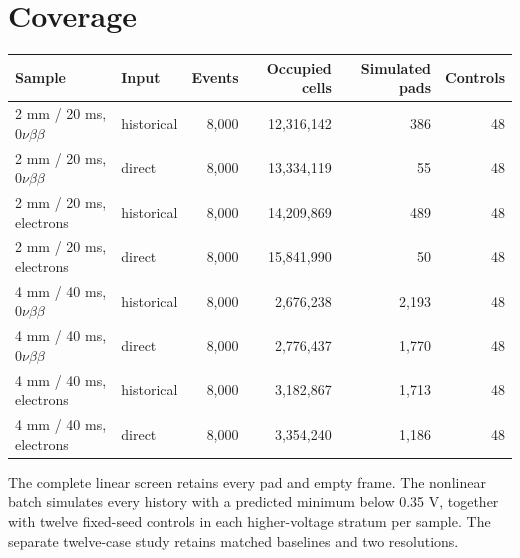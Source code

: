 \documentclass[11pt,a4paper]{article}
\begin{document}
\section{Coverage}
\begin{center}\scriptsize\begin{tabular}{llrrrr}\toprule
Sample & Input & Events & Occupied cells & Simulated pads & Controls\\\midrule
2 mm / 20 ms, $0\nu\beta\beta$ & historical & 8,000 & 12,316,142 & 386 & 48 \\
2 mm / 20 ms, $0\nu\beta\beta$ & direct & 8,000 & 13,334,119 & 55 & 48 \\
2 mm / 20 ms, electrons & historical & 8,000 & 14,209,869 & 489 & 48 \\
2 mm / 20 ms, electrons & direct & 8,000 & 15,841,990 & 50 & 48 \\
4 mm / 40 ms, $0\nu\beta\beta$ & historical & 8,000 & 2,676,238 & 2,193 & 48 \\
4 mm / 40 ms, $0\nu\beta\beta$ & direct & 8,000 & 2,776,437 & 1,770 & 48 \\
4 mm / 40 ms, electrons & historical & 8,000 & 3,182,867 & 1,713 & 48 \\
4 mm / 40 ms, electrons & direct & 8,000 & 3,354,240 & 1,186 & 48 \\
\bottomrule\end{tabular}\end{center}
The complete linear screen retains every pad and empty frame. The nonlinear
batch simulates every history with a predicted minimum below 0.35 V, together
with twelve fixed-seed controls in each higher-voltage stratum per sample.
The separate twelve-case study retains matched baselines and two resolutions.
\end{document}
